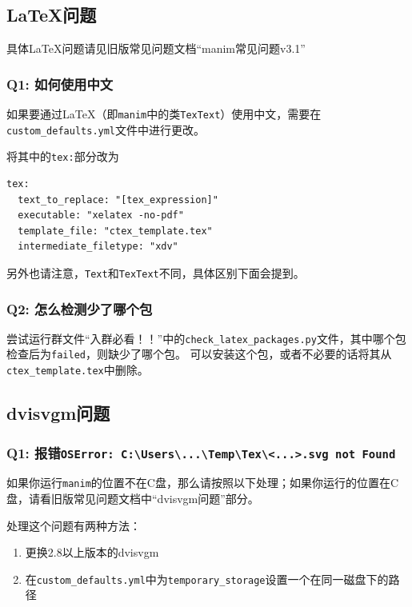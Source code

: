 \documentclass[cn,blue,14pt,normal]{elegantnote}
\begin{document}
\subsection{\LaTeX 问题}
具体\LaTeX 问题请见旧版常见问题文档“manim常见问题v3.1”

\subsubsection*{Q1: 如何使用中文}
如果要通过\LaTeX （即\texttt{manim}中的类\texttt{TexText}）使用中文，需要在\texttt{custom\_defaults.yml}文件中进行更改。

将其中的\texttt{tex:}部分改为
\begin{lstlisting}[frame=none, columns=flexible]
tex:
  text_to_replace: "[tex_expression]"
  executable: "xelatex -no-pdf"
  template_file: "ctex_template.tex"
  intermediate_filetype: "xdv"
\end{lstlisting}

另外也请注意，\texttt{Text}和\texttt{TexText}不同，具体区别下面会提到。

\subsubsection*{Q2: 怎么检测少了哪个包}
尝试运行群文件“入群必看！！”中的\texttt{check\_latex\_packages.py}文件，其中哪个包检查后为\texttt{failed}，则缺少了哪个包。
可以安装这个包，或者不必要的话将其从\texttt{ctex\_template.tex}中删除。

\subsection{dvisvgm问题}
\subsubsection*{Q1: 报错\texttt{OSError: C:\textbackslash Users\textbackslash ...\textbackslash Temp\textbackslash Tex\textbackslash <...>.svg not Found}}
如果你运行\texttt{manim}的位置不在C盘，那么请按照以下处理；如果你运行的位置在C盘，请看旧版常见问题文档中“dvisvgm问题”部分。

处理这个问题有两种方法：
\begin{enumerate}[1.]
	\item 更换2.8以上版本的dvisvgm
	\item 在\texttt{custom\_defaults.yml}中为\texttt{temporary\_storage}设置一个在同一磁盘下的路径
\end{enumerate}
\end{document}
